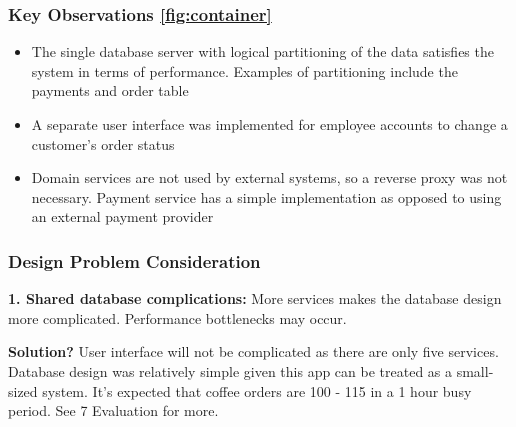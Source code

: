 \documentclass{article}
\begin{document}
\subsubsection*{Key Observations \ref{fig:container}} 
\begin{itemize}
    \item The single database server with logical partitioning of the data satisfies the system in terms of performance. Examples of partitioning include the payments and order table
    \item A separate user interface was implemented for employee accounts to change a customer's order status
    \item Domain services are not used by external systems, so a reverse proxy was not necessary. Payment service has a simple implementation as opposed to using an external payment provider 
\end{itemize}

\subsubsection*{Design Problem Consideration}
\bigskip \hfill \begin{minipage}{\dimexpr\textwidth-0.5cm}
\textbf{1. Shared database complications:} More services makes the database design more complicated. Performance bottlenecks may occur. 

\medskip \textbf{Solution?} User interface will not be complicated as there are only five services. Database design was relatively simple given this app can be treated as a small-sized system. It's expected that coffee orders are 100 - 115 in a 1 hour busy period. See 7 Evaluation for more.
\end{minipage}
\end{document}
